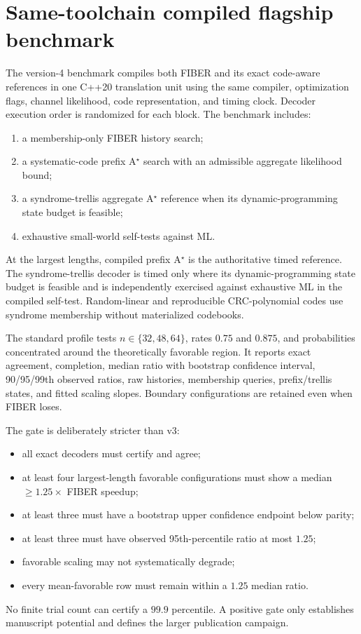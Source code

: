 \documentclass[11pt]{article}
\theoremstyle{definition}
\theoremstyle{remark}
\begin{document}
\section{Same-toolchain compiled flagship benchmark}
The version-4 benchmark compiles both FIBER and its exact code-aware references in one C++20 translation unit using the same compiler, optimization flags, channel likelihood, code representation, and timing clock.  Decoder execution order is randomized for each block.  The benchmark includes:
\begin{enumerate}[leftmargin=2em]
\item a membership-only FIBER history search;
\item a systematic-code prefix A$^\star$ search with an admissible aggregate likelihood bound;
\item a syndrome-trellis aggregate A$^\star$ reference when its dynamic-programming state budget is feasible;
\item exhaustive small-world self-tests against ML.
\end{enumerate}
At the largest lengths, compiled prefix A$^\star$ is the authoritative timed reference.  The syndrome-trellis decoder is timed only where its dynamic-programming state budget is feasible and is independently exercised against exhaustive ML in the compiled self-test.  Random-linear and reproducible CRC-polynomial codes use syndrome membership without materialized codebooks.

The standard profile tests $n\in\{32,48,64\}$, rates $0.75$ and $0.875$, and probabilities concentrated around the theoretically favorable region.  It reports exact agreement, completion, median ratio with bootstrap confidence interval, 90/95/99th observed ratios, raw histories, membership queries, prefix/trellis states, and fitted scaling slopes.  Boundary configurations are retained even when FIBER loses.

The gate is deliberately stricter than v3:
\begin{itemize}[leftmargin=2em]
\item all exact decoders must certify and agree;
\item at least four largest-length favorable configurations must show a median $\ge1.25\times$ FIBER speedup;
\item at least three must have a bootstrap upper confidence endpoint below parity;
\item at least three must have observed 95th-percentile ratio at most $1.25$;
\item favorable scaling may not systematically degrade;
\item every mean-favorable row must remain within a $1.25$ median ratio.
\end{itemize}
No finite trial count can certify a $99.9$ percentile.  A positive gate only establishes manuscript potential and defines the larger publication campaign.
\end{document}
